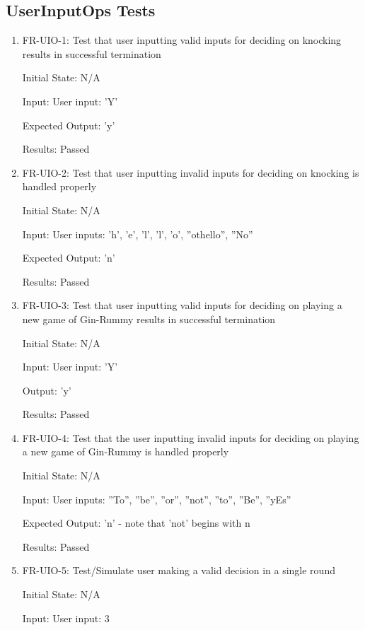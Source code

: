 \documentclass[12pt, titlepage]{article}
\begin{document}
\subsection{UserInputOps Tests}
\begin{enumerate}
    \item FR-UIO-1: Test that user inputting valid inputs for deciding on knocking results in successful termination
    
    Initial State: N/A
    
    Input: User input: 'Y'
    
    Expected Output: 'y'
    
    Results: Passed
    
    \item FR-UIO-2: Test that user inputting invalid inputs for deciding on knocking is handled properly
    
    Initial State: N/A
    
    Input: User inputs: ’h’, ’e’, ’l’, ’l’, ’o’, ”othello”, ”No”
    
    Expected Output: 'n'
    
    Results: Passed
    
    \item FR-UIO-3: Test that user inputting valid inputs for deciding on playing a new game of Gin-Rummy results in successful termination
    
    Initial State: N/A
    
    Input: User input: 'Y'
    
    Output: 'y'
    
    Results: Passed
    
    \item FR-UIO-4: Test that the user inputting invalid inputs for deciding on playing a new game of Gin-Rummy is handled properly
    
    Initial State: N/A
    
    Input: User inputs:  ”To”, ”be”, ”or”, ”not”, ”to”, ”Be”, ”yEs”
    
    Expected Output: ’n’ - note that ’not’ begins with n
    
    Results: Passed
    
    \item FR-UIO-5: Test/Simulate user making a valid decision in a single round
    
    Initial State:  N/A
    
    Input: User input: 3
    

\end{enumerate}
\end{document}
